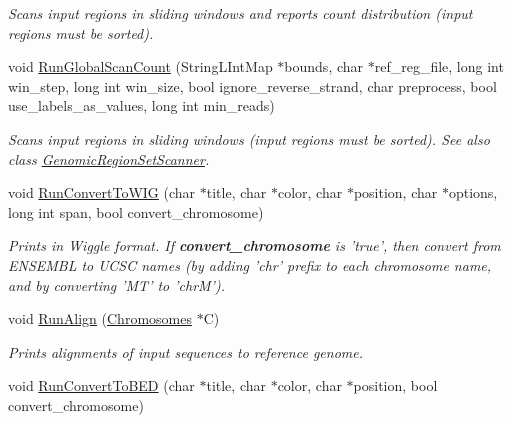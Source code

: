 \begin{DoxyCompactItemize}
\begin{DoxyCompactList}\small\item\em Scans input regions in sliding windows and reports count distribution (input regions must be sorted). \end{DoxyCompactList}\item 
void \hyperlink{classGenomicRegionSet_a45cac26bedec4d983127b93d2096f735}{RunGlobalScanCount} (StringLIntMap $\ast$bounds, char $\ast$ref\_\-reg\_\-file, long int win\_\-step, long int win\_\-size, bool ignore\_\-reverse\_\-strand, char preprocess, bool use\_\-labels\_\-as\_\-values, long int min\_\-reads)
\begin{DoxyCompactList}\small\item\em Scans input regions in sliding windows (input regions must be sorted). See also class \hyperlink{classGenomicRegionSetScanner}{GenomicRegionSetScanner}. \end{DoxyCompactList}\item 
\hypertarget{classGenomicRegionSet_a6377c10b1e9903ff5ae3b0ff9fe20e4d}{
void \hyperlink{classGenomicRegionSet_a6377c10b1e9903ff5ae3b0ff9fe20e4d}{RunConvertToWIG} (char $\ast$title, char $\ast$color, char $\ast$position, char $\ast$options, long int span, bool convert\_\-chromosome)}
\label{classGenomicRegionSet_a6377c10b1e9903ff5ae3b0ff9fe20e4d}

\begin{DoxyCompactList}\small\item\em Prints in Wiggle format. If {\bfseries convert\_\-chromosome} is 'true', then convert from ENSEMBL to UCSC names (by adding 'chr' prefix to each chromosome name, and by converting 'MT' to 'chrM'). \end{DoxyCompactList}\item 
\hypertarget{classGenomicRegionSet_ada3da7ef918c09867341cda32881d63e}{
void \hyperlink{classGenomicRegionSet_ada3da7ef918c09867341cda32881d63e}{RunAlign} (\hyperlink{classChromosomes}{Chromosomes} $\ast$C)}
\label{classGenomicRegionSet_ada3da7ef918c09867341cda32881d63e}

\begin{DoxyCompactList}\small\item\em Prints alignments of input sequences to reference genome. \end{DoxyCompactList}\item 
\hypertarget{classGenomicRegionSet_a18669fb4dfdf1287aaf9cfceb8329cb5}{
void \hyperlink{classGenomicRegionSet_a18669fb4dfdf1287aaf9cfceb8329cb5}{RunConvertToBED} (char $\ast$title, char $\ast$color, char $\ast$position, bool convert\_\-chromosome)}
\label{classGenomicRegionSet_a18669fb4dfdf1287aaf9cfceb8329cb5}


\end{DoxyCompactItemize}
